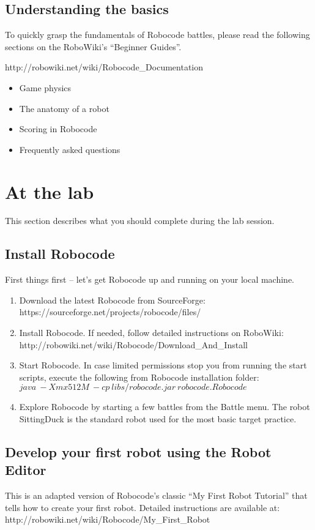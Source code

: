 \documentclass{scrreprt}
\begin{document}
\section{Understanding the basics}
To quickly grasp the fundamentals of Robocode battles, please read the following sections on the RoboWiki's ``Beginner Guides''. 

http://robowiki.net/wiki/Robocode\_Documentation
\begin{itemize}
\item Game physics
\item The anatomy of a robot
\item Scoring in Robocode
\item Frequently asked questions
\end{itemize}

\chapter{At the lab}
This section describes what you should complete during the lab session.

\section{Install Robocode} \label{sec:install}
First things first -- let's get Robocode up and running on your local machine.

\begin{enumerate}
\item Download the latest Robocode from SourceForge:\\https://sourceforge.net/projects/robocode/files/
\item Install Robocode. If needed, follow detailed instructions on RoboWiki:\\http://robowiki.net/wiki/Robocode/Download\_And\_Install
\item Start Robocode. In case limited permissions stop you from running the start scripts, execute the following from Robocode installation folder:\\
$java~-Xmx512M~-cp~libs/robocode.jar~robocode.Robocode$
\item Explore Robocode by starting a few battles from the Battle menu. The robot SittingDuck is the standard robot used for the most basic target practice.
\end{enumerate}

\section{Develop your first robot using the Robot Editor} \label{sec:myfirstrobot}
This is an adapted version of Robocode's classic ``My First Robot Tutorial'' that tells how to create your first robot. Detailed instructions are available at:\\http://robowiki.net/wiki/Robocode/My\_First\_Robot
\end{document}
